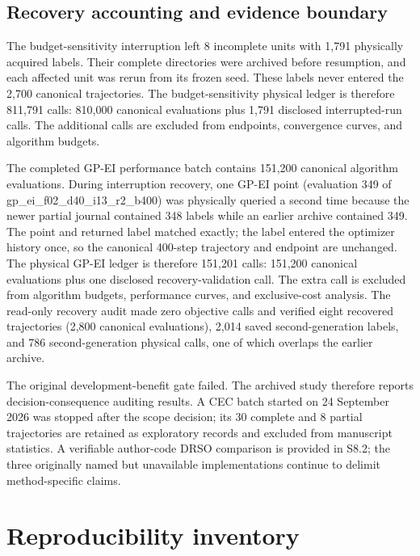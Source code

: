 \documentclass[suppldata]{interact}
\begin{document}
\hypertarget{recovery-accounting-and-evidence-boundary}{%
\subsection{Recovery accounting and evidence boundary}\label{recovery-accounting-and-evidence-boundary}}

The budget-sensitivity interruption left 8 incomplete units with 1,791 physically acquired labels. Their complete directories were archived before resumption, and each affected unit was rerun from its frozen seed. These labels never entered the 2,700 canonical trajectories. The budget-sensitivity physical ledger is therefore 811,791 calls: 810,000 canonical evaluations plus 1,791 disclosed interrupted-run calls. The additional calls are excluded from endpoints, convergence curves, and algorithm budgets.

The completed GP-EI performance batch contains 151,200 canonical algorithm evaluations. During interruption recovery, one GP-EI point (evaluation 349 of gp\_\allowbreak ei\_\allowbreak f02\_\allowbreak d40\_\allowbreak i13\_\allowbreak r2\_\allowbreak b400) was physically queried a second time because the newer partial journal contained 348 labels while an earlier archive contained 349. The point and returned label matched exactly; the label entered the optimizer history once, so the canonical 400-step trajectory and endpoint are unchanged. The physical GP-EI ledger is therefore 151,201 calls: 151,200 canonical evaluations plus one disclosed recovery-validation call. The extra call is excluded from algorithm budgets, performance curves, and exclusive-cost analysis. The read-only recovery audit made zero objective calls and verified eight recovered trajectories (2,800 canonical evaluations), 2,014 saved second-generation labels, and 786 second-generation physical calls, one of which overlaps the earlier archive.

The original development-benefit gate failed. The archived study therefore reports decision-consequence auditing results. A CEC batch started on 24 September 2026 was stopped after the scope decision; its 30 complete and 8 partial trajectories are retained as exploratory records and excluded from manuscript statistics. A verifiable author-code DRSO comparison is provided in S8.2; the three originally named but unavailable implementations continue to delimit method-specific claims.

\hypertarget{reproducibility-inventory}{%
\section{Reproducibility inventory}\label{reproducibility-inventory}}
\end{document}

